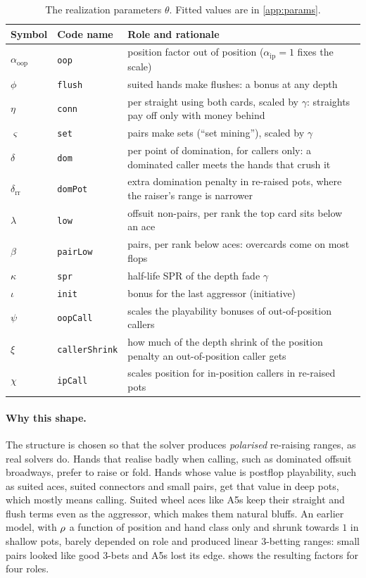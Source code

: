 \begin{table}[ht]
\centering\small
\begin{tabularx}{\linewidth}{@{}llX@{}}
\toprule
Symbol & Code name & Role and rationale \\
\midrule
$\alpha_{\mathrm{oop}}$ & \texttt{oop} & position factor out of position ($\alpha_{\mathrm{ip}} = 1$ fixes the scale) \\
$\phi$ & \texttt{flush} & suited hands make flushes: a bonus at any depth \\
$\eta$ & \texttt{conn} & per straight using both cards, scaled by $\gamma$: straights pay off only with money behind \\
$\varsigma$ & \texttt{set} & pairs make sets (\enquote{set mining}), scaled by $\gamma$ \\
$\delta$ & \texttt{dom} & per point of domination, for callers only: a dominated caller meets the hands that crush it \\
$\delta_{\mathrm{rr}}$ & \texttt{domPot} & extra domination penalty in re-raised pots, where the raiser's range is narrower \\
$\lambda$ & \texttt{low} & offsuit non-pairs, per rank the top card sits below an ace \\
$\beta$ & \texttt{pairLow} & pairs, per rank below aces: overcards come on most flops \\
$\kappa$ & \texttt{spr} & half-life SPR of the depth fade $\gamma$ \\
$\iota$ & \texttt{init} & bonus for the last aggressor (initiative) \\
$\psi$ & \texttt{oopCall} & scales the playability bonuses of out-of-position callers \\
$\xi$ & \texttt{callerShrink} & how much of the depth shrink of the position penalty an out-of-position caller gets \\
$\chi$ & \texttt{ipCall} & scales position for in-position callers in re-raised pots \\
\bottomrule
\end{tabularx}
\caption{The realization parameters $\theta$. Fitted values are in \cref{app:params}.}
\label{tab:params}
\end{table}

\paragraph{Why this shape.} The structure is chosen so that the solver produces \emph{polarised} re-raising ranges, as real solvers do. Hands that realise badly when calling, such as dominated offsuit broadways, prefer to raise or fold. Hands whose value is postflop playability, such as suited aces, suited connectors and small pairs, get that value in deep pots, which mostly means calling. Suited wheel aces like A5s keep their straight and flush terms even as the aggressor, which makes them natural bluffs. An earlier model, with $\rho$ a function of position and hand class only and shrunk towards $1$ in shallow pots, barely depended on role and produced linear 3-betting ranges: small pairs looked like good 3-bets and A5s lost its edge.  shows the resulting factors for four roles.

